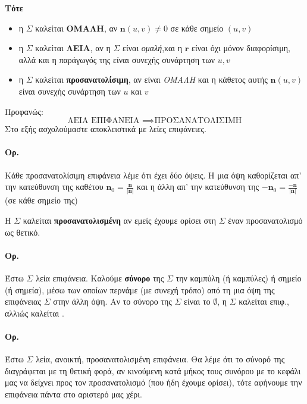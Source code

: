 \documentclass[11pt,a4paper,titlepage]{article}
\begin{document}
\textbf{Τότε}
\begin{itemize}
\item η \( \varSigma \) καλείται \textbf{ΟΜΑΛΗ}, αν \( \mathbf n(u,v) \neq 0 \) σε κάθε σημείο \( (u,v) \)
\item η \( \varSigma \) καλείται \textbf{ΛΕΙΑ}, αν η \( \varSigma \) είναι \emph{ομαλή},και η \( \mathbf r \) είναι όχι μόνον διαφορίσιμη, αλλά και η παράγωγός της είναι συνεχής συνάρτηση των \( u,v \)
\item η \( \varSigma \) καλείται \textbf{προσανατολίσιμη}, αν είναι \emph{ΟΜΑΛΗ} και η κάθετος αυτής \( \mathbf n(u,v) \) είναι συνεχής συνάρτηση των \( u \) και \( v \)
\end{itemize}

Προφανώς:
\[
\text{ΛΕΙΑ ΕΠΙΦΑΝΕΙΑ } \implies \text{ΠΡΟΣΑΝΑΤΟΛΙΣΙΜΗ}
\]
Στο εξής ασχολούμαστε αποκλειστικά με λείες επιφάνειες.

\paragraph{Ορ.}
Κάθε προσανατολίσιμη επιφάνεια λέμε ότι έχει δύο όψεις. Η μια όψη καθορίζεται απ' την κατεύθυνση της καθέτου \( \mathbf n_0 = \frac{\mathbf n}{|\mathbf n|} \) και η άλλη απ' την κατεύθυνση της \( -\mathbf n_0 = \frac{-\mathbf n}{|\mathbf n|} \) (σε κάθε σημείο της)

H \( \varSigma \) καλείται \textbf{προσανατολισμένη} αν εμείς έχουμε ορίσει στη \( \varSigma \) έναν προσανατολισμό ως θετικό.

\paragraph{Ορ.}
Έστω \( \varSigma \) λεία επιφάνεια. Καλούμε \textbf{σύνορο} της \( \varSigma \) την καμπύλη (ή καμπύλες) ή σημείο (ή σημεία), μέσω των οποίων περνάμε (με συνεχή τρόπο) από τη μια όψη της επιφάνειας \( \varSigma \) στην άλλη όψη. Αν το σύνορο της \( \varSigma \) είναι το \( \emptyset \), η \( \varSigma \) καλείται  επιφ., αλλιώς καλείται .

\paragraph{Ορ.}
Έστω \( \varSigma \) λεία, ανοικτή, προσανατολισμένη επιφάνεια. Θα λέμε ότι το σύνορό της διαγράφεται με τη θετική φορά, αν κινούμενη κατά μήκος τους συνόρου με το κεφάλι μας να δείχνει προς τον προσανατολισμό (που ήδη έχουμε ορίσει), τότε αφήνουμε την επιφάνεια πάντα στο αριστερό μας χέρι.
\end{document}
